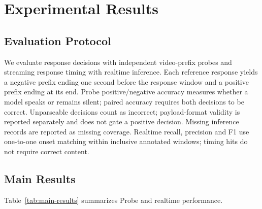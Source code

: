 
\section{Experimental Results}

\subsection{Evaluation Protocol}

We evaluate response decisions with independent video-prefix probes and streaming response timing with realtime inference. Each reference response yields a negative prefix ending one second before the response window and a positive prefix ending at its end. Probe positive/negative accuracy measures whether a model speaks or remains silent; paired accuracy requires both decisions to be correct. Unparseable decisions count as incorrect; payload-format validity is reported separately and does not gate a positive decision. Missing inference records are reported as missing coverage. Realtime recall, precision and F1 use one-to-one onset matching within inclusive annotated windows; timing hits do not require correct content.

\subsection{Main Results}

Table~\ref{tab:main-results} summarizes Probe and realtime performance.

